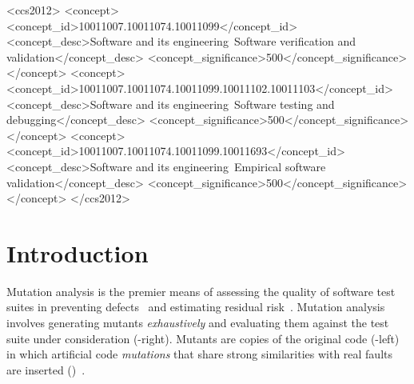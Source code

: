 \documentclass[sigconf]{acmart}
\begin{document}
\begin{CCSXML}
<ccs2012>
   <concept>
       <concept_id>10011007.10011074.10011099</concept_id>
       <concept_desc>Software and its engineering~Software verification and validation</concept_desc>
       <concept_significance>500</concept_significance>
       </concept>
   <concept>
       <concept_id>10011007.10011074.10011099.10011102.10011103</concept_id>
       <concept_desc>Software and its engineering~Software testing and debugging</concept_desc>
       <concept_significance>500</concept_significance>
       </concept>
   <concept>
       <concept_id>10011007.10011074.10011099.10011693</concept_id>
       <concept_desc>Software and its engineering~Empirical software validation</concept_desc>
       <concept_significance>500</concept_significance>
       </concept>
 </ccs2012>
\end{CCSXML}





\maketitle

\section{Introduction}
Mutation analysis is the premier means of assessing the quality of
software test suites in preventing defects~\cite{papadakis2019mutation}
and estimating residual risk~\cite{horgan1996software}.
Mutation analysis involves
generating mutants \emph{exhaustively} and evaluating them against the test suite under consideration
(-right).
Mutants are copies of the original code (-left) in which artificial code %
\emph{mutations} that share strong similarities with real faults are inserted ()~\cite{daran1996software,just2014are,andrews2005is,andrews2006using}.
\end{document}

